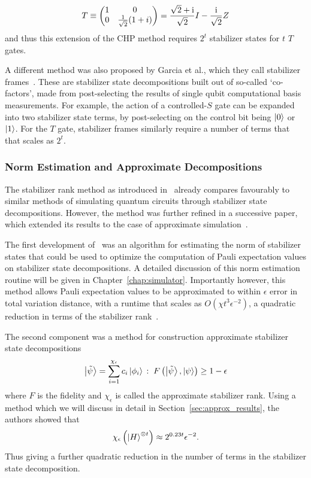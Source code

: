 \[T\equiv \begin{pmatrix}1 & 0 \\ 0 & \frac{1}{\sqrt{2}}(1+i)\end{pmatrix} = \frac{\sqrt{2}+\mathrm{i}}{\sqrt{2}}I-\frac{\mathrm{i}}{\sqrt{2}}Z \]
and thus this extension of the CHP method requires $2^{t}$ stabilizer states for $t$ $T$ gates.\par
A different method was also proposed by Garcia et al., which they call stabilizer frames~\cite{Garcia2015}. These are stabilizer state decompositions built out of so-called `co-factors', made from post-selecting the results of single qubit computational basis measurements. For example, the action of a controlled-$S$ gate can be expanded into two stabilizer state terms, by post-selecting on the control bit being $\ket{0}$ or $\ket{1}$. For the $T$ gate, stabilizer frames similarly require a number of terms that that scales as $2^{t}$.
\subsubsection*{Norm Estimation and Approximate Decompositions}
The stabilizer rank method as introduced in~\cite{Bravyi2015} already compares favourably to similar methods of simulating quantum circuits through stabilizer state decompositions. However, the method was further refined in a successive paper, which extended its results to the case of approximate simulation~\cite{Bravyi2016}.\par
The first development of~\cite{Bravyi2016} was an algorithm for estimating the norm of stabilizer states that could be used to optimize the computation of Pauli expectation values on stabilizer state decompositions. A detailed discussion of this norm estimation routine will be given in Chapter~\ref{chap:simulator}. Importantly however, this method allows Pauli expectation values to be approximated to within $\epsilon$ error in total variation distance, with a runtime that scales as $O(\chi t^{3}\epsilon^{-2})$, a quadratic reduction in terms of the stabilizer rank~\cite{Bravyi2016}.\par
The second component was a method for construction approximate stabilizer state decompositions
\begin{equation}
\ket{\tilde{\psi}}=\sum_{i=1}^{\chi_{\epsilon}}c_{i}\ket{\phi_{i}}\,:\;F\left(\ket{\tilde{\psi}},\ket{\psi}\right)\geq1-\epsilon
\label{eq:old_approx_rank}
\end{equation}
where $F$ is the fidelity and $\chi_{\epsilon}$ is called the approximate stabilizer rank. Using a method which we will discuss in detail in Section~\ref{sec:approx_results}, the authors showed that
\begin{equation}
\chi_{\epsilon}\left(\ket{H}^{\otimes t}\right)\approx 2^{0.23t}\epsilon^{-2}.
\label{eq:approx_t_rank}
\end{equation}
Thus giving a further quadratic reduction in the number of terms in the stabilizer state decomposition.\par
